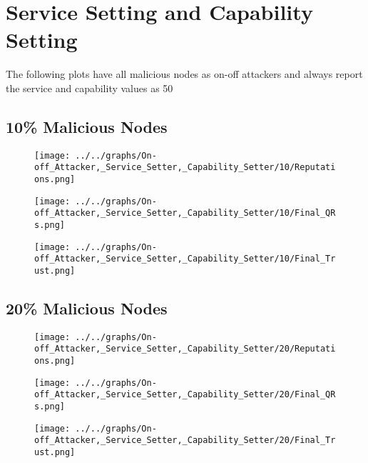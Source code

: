 \section*{Service Setting and Capability Setting}
The following plots have all malicious nodes as on-off attackers and always
report the service and capability values as 50
\\
\begin{minipage}[t]{0.49\columnwidth}
\subsection*{10\% Malicious Nodes}
    \begin{figure}[H]
        \centering
        \texttt{[image: ../../graphs/On-off\_Attacker,\_Service\_Setter,\_Capability\_Setter/10/Reputations.png]}
    \end{figure}
    \begin{figure}[H]
        \centering
        \texttt{[image: ../../graphs/On-off\_Attacker,\_Service\_Setter,\_Capability\_Setter/10/Final\_QRs.png]}
    \end{figure}
\end{minipage}
\begin{minipage}[t]{0.49\columnwidth}
    \begin{figure}[H]
        \centering
        \texttt{[image: ../../graphs/On-off\_Attacker,\_Service\_Setter,\_Capability\_Setter/10/Final\_Trust.png]}
    \end{figure}
\end{minipage}

\begin{minipage}[t]{0.49\columnwidth}
\subsection*{20\% Malicious Nodes}
    \begin{figure}[H]
        \centering
        \texttt{[image: ../../graphs/On-off\_Attacker,\_Service\_Setter,\_Capability\_Setter/20/Reputations.png]}
    \end{figure}
    \begin{figure}[H]
        \centering
        \texttt{[image: ../../graphs/On-off\_Attacker,\_Service\_Setter,\_Capability\_Setter/20/Final\_QRs.png]}
    \end{figure}
\end{minipage}
\begin{minipage}[t]{0.49\columnwidth}
    \begin{figure}[H]
        \centering
        \texttt{[image: ../../graphs/On-off\_Attacker,\_Service\_Setter,\_Capability\_Setter/20/Final\_Trust.png]}
    \end{figure}
\end{minipage}

